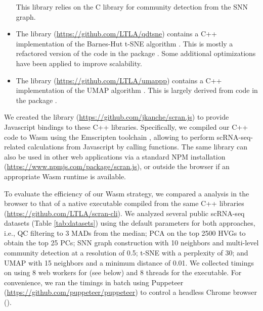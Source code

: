 \documentclass{article}
\begin{document}
\begin{itemize}
This library relies on the  C library \cite{csardi2006igraph} for community detection from the SNN graph.
\item The  library (\url{https://github.com/LTLA/qdtsne}) contains a C++ implementation of the Barnes-Hut t-SNE algorithm \cite{maaten2014accelerating}.
This is mostly a refactored version of the code in the  package \cite{rtsne}.
Some additional optimizations have been applied to improve scalability.
\item The  library (\url{https://github.com/LTLA/umappp}) contains a C++ implementation of the UMAP algorithm \cite{mcinnes2018umap}.
This is largely derived from code in the  package \cite{uwot}.
\end{itemize}

We created the  library (\url{https://github.com/jkanche/scran.js}) to provide Javascript bindings to these C++ libraries.
Specifically, we compiled our C++ code to Wasm using the Emscripten toolchain \cite{zakai2011emscripten},
allowing  to perform scRNA-seq-related calculations from Javascript by calling  functions.
The same library can also be used in other web applications via a standard NPM installation (\url{https://www.npmjs.com/package/scran.js}),
or outside the browser if an appropriate Wasm runtime is available.

To evaluate the efficiency of our Wasm strategy, 
we compared a  analysis in the browser to that of a native executable compiled from the same C++ libraries (\url{https://github.com/LTLA/scran-cli}).
We analyzed several public scRNA-seq datasets (Table \ref{tab:datasets}) using the default  parameters for both approaches, i.e.,
QC filtering to 3 MADs from the median;
PCA on the top 2500 HVGs to obtain the top 25 PCs;
SNN graph construction with 10 neighbors and multi-level community detection at a resolution of 0.5;
t-SNE with a perplexity of 30;
and UMAP with 15 neighbors and a minimum distance of 0.01.
We collected timings on  using 8 web workers for  (see below) and 8 threads for the executable.
For convenience, we ran the  timings in batch using Puppeteer (\url{https://github.com/puppeteer/puppeteer}) to control a headless Chrome browser ().
\end{document}
